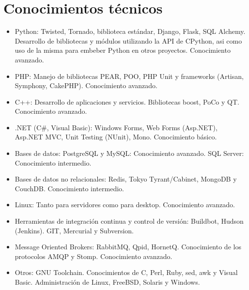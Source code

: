 \documentclass[a4paper,11pt]{moderncv}
\begin{document}
\section{Conocimientos t\'ecnicos}
\begin{itemize}
\item Python: Twisted, Tornado, biblioteca est\'andar, Django, Flask, SQL Alchemy. Desarrollo de bibliotecas y m\'odulos utilizando la API de CPython, asi como uso de la misma para embeber Python en otros proyectos. Conocimiento avanzado.
\item PHP: Manejo de bibliotecas PEAR, POO, PHP Unit y frameworks (Artisan, Symphony, CakePHP).  Conocimiento avanzado.
\item C++: Desarrollo de aplicaciones y servicios. Bibliotecas boost, PoCo y QT. Conocimiento avanzado.
\item .NET (C\#, Visual Basic): Windows Forms, Web Forms (Asp.NET), Asp.NET MVC, Unit Testing (NUnit), Mono. Conocimiento b\'asico.
\item Bases de datos: PostgreSQL y MySQL: Conocimiento avanzado. SQL Server: Conocimiento intermedio.
\item Bases de datos no relacionales: Redis, Tokyo Tyrant/Cabinet, MongoDB y CouchDB. Conocimiento intermedio.
\item Linux: Tanto para servidores como para desktop. Conocimiento avanzado.
\item Herramientas de integraci\'on continua y control de versi\'on: Buildbot, Hudson (Jenkins). GIT, Mercurial y Subversion.
\item Message Oriented Brokers: RabbitMQ, Qpid, HornetQ. Conocimiento de los protocolos AMQP y Stomp. Conocimiento avanzado.
\item Otros: GNU Toolchain. Conocimientos de C, Perl, Ruby, sed, awk y Visual Basic. Administraci\'on de Linux, FreeBSD, Solaris y Windows.
\end{itemize}

\pagebreak
\end{document}
